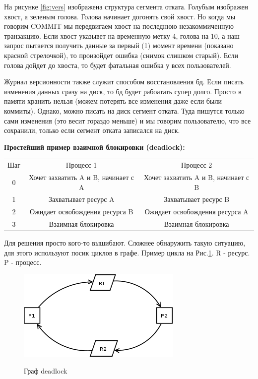 На рисунке \ref{fig:vers} изображена структура сегмента отката. Голубым изображен хвост, а зеленым голова. Голова начинает догонять свой хвост. Но когда мы говорим COMMIT мы передвигаем хвост на последнюю незакоммиченную транзакцию. Если хвост указывет на временную метку 4, голова на 10, а наш запрос пытается получить данные за первый (1) момент времени (показано красной стрелочкой), то произойдет ошибка (снимок слишком старый). Если голова дойдет до хвоста, то будет фатальная ошибка у всех пользователей. 


Журнал версионности также служит способом восстановления бд. Если писать изменения данных сразу на диск, то бд будет рабоатать супер долго. Просто в памяти хранить нельзя (можем потерять все изменения даже если были коммиты). Однако, можно писать на диск сегмент отката. Туда пишутся только сами изменения (это весит гораздо меньше) и мы говорим пользователю, что все сохранили, только если сегмент отката записался на диск. 

\textbf{Простейший пример взаимной блокировки (deadlock):}

\begin{center}
	\begin{tabular}{c|c | c}
		Шаг	& Процесс 1	& Процесс 2 \\
		0	&Хочет захватить A и B, начинает с A &	Хочет захватить A и B, начинает с B \\
		1&	Захватывает ресурс A &	Захватывает ресурс B \\
		2&	Ожидает освобождения ресурса B	& Ожидает освобождения ресурса A \\
		3	&Взаимная блокировка & Взаимная блокировка
	\end{tabular}
\end{center}

Для решения просто кого-то вышибают. Сложнее обнаружить такую ситуацию, для этого используют посик циклов в графе. Пример цикла на Рис.\ref{fig:dead}. R - ресурс. P - процесс. 

\begin{figure}[H]
	\centering
	\includegraphics[scale = 0.5]{6/deadlock.png}
	\label{fig:dead}
	\caption{Граф deadlock}
	
\end{figure}